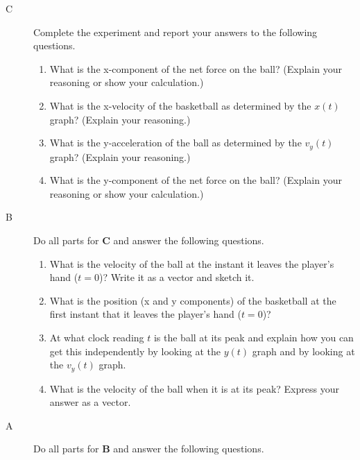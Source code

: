 \begin{description}

\item[C]  Complete the experiment and report your answers to the following questions.

\begin{enumerate}
	 \item What is the x-component of the net force on the ball? (Explain your reasoning or show your calculation.)
	 \item What is the x-velocity of the basketball as determined by the $x(t)$ graph? (Explain your reasoning.)
	 \item What is the y-acceleration of the ball as determined by the $v_y(t)$ graph? (Explain your reasoning.)
	 \item What is the y-component of the net force on the ball? (Explain your reasoning or show your calculation.)
\end{enumerate}

\item[B] Do all parts for {\bf C} and answer the following questions.

\begin{enumerate}
	\item What is the velocity of the ball at the instant it leaves the player's hand ($t=0$)? Write it as a vector and sketch it.
	\item What is the position (x and y components) of the basketball at the first instant that it leaves the player's hand ($t=0$)?
	\item At what clock reading $t$ is the ball at its peak and explain how you can get this independently by looking at the $y(t)$ graph and by looking at the $v_y(t)$ graph.
	\item What is the velocity of the ball when it is at its peak? Express your answer as a vector.
\end{enumerate}

\item[A] Do all parts for {\bf B} and answer the following questions.


\end{description}
